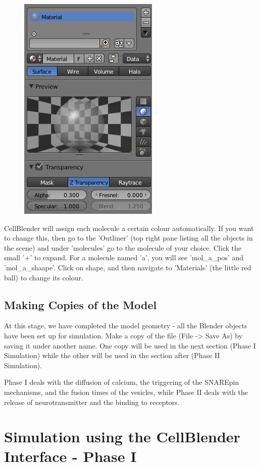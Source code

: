 \documentclass[twoside,a4paper]{refart}
\begin{document}
    \begin{figure}[H]
        \includegraphics[scale=0.5]{settings3.png}
    \end{figure}

CellBlender will assign each molecule a certain colour automatically. If you want to change this, then go to the 'Outliner' (top right pane listing all the objects in the scene) and under 'molecules' go to the molecule of your choice. Click the small '+' to expand. For a molecule named 'a', you will see 'mol\_a\_pos' and 'mol\_a\_shaape'. Click on shape, and then navigate to 'Materials' (the little red ball) to change its colour.


\subsection{Making Copies of the Model}
At this stage, we have completed the model geometry - all the Blender objects have been set up for simulation. Make a copy of the file  (File -> Save As) by saving it under another name. One copy will be used in the next section (Phase I Simulation) while the other will be used in the section after (Phase II Simulation).

Phase I deals with the diffusion of calcium, the triggering of the SNAREpin mechanisms, and the fusion times of the vesicles, while Phase II deals with the release of neurotransmitter and the binding to receptors.

\section{Simulation using the CellBlender Interface - Phase I}
\end{document}
